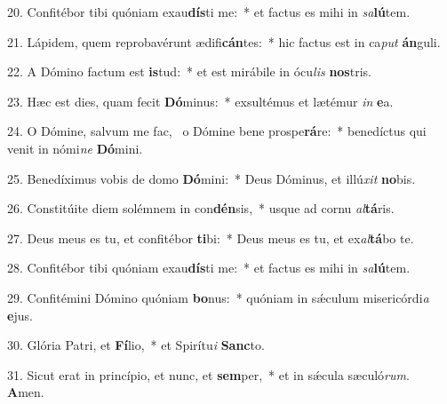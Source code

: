 20. Confitébor tibi quóniam exau\textbf{dís}ti me:~*  et factus es mihi in \textit{sa}\textbf{lú}tem.\

21. Lápidem, quem reprobavérunt ædifi\textbf{cán}tes:~*  hic factus est in ca\textit{put} \textbf{án}guli.\

22. A Dómino factum est \textbf{is}tud:~*  et est mirábile in ócu\textit{lis} \textbf{nos}tris.\

23. Hæc est dies, quam fecit \textbf{Dó}minus:~*  exsultémus et lætémur \textit{in} \textbf{e}a.\

24. O Dómine, salvum me fac, \dag\  o Dómine bene prospe\textbf{rá}re:~*  benedíctus qui venit in nómi\textit{ne} \textbf{Dó}mini.\

25. Benedíximus vobis de domo \textbf{Dó}mini:~*  Deus Dóminus, et illú\textit{xit} \textbf{no}bis.\

26. Constitúite diem solémnem in con\textbf{dén}sis,~*  usque ad cornu \textit{al}\textbf{tá}ris.\

27. Deus meus es tu, et confitébor \textbf{ti}bi:~*  Deus meus es tu, et ex\textit{al}\textbf{tá}bo te.\

28. Confitébor tibi quóniam exau\textbf{dís}ti me:~*  et factus es mihi in \textit{sa}\textbf{lú}tem.\

29. Confitémini Dómino quóniam \textbf{bo}nus:~*  quóniam in sǽculum misericórdi\textit{a} \textbf{e}jus.\

30. Glória Patri, et \textbf{Fí}lio,~*  et Spirítu\textit{i} \textbf{Sanc}to.\

31. Sicut erat in princípio, et nunc, et \textbf{sem}per,~*  et in sǽcula sæculó\textit{rum}. \textbf{A}men.\

